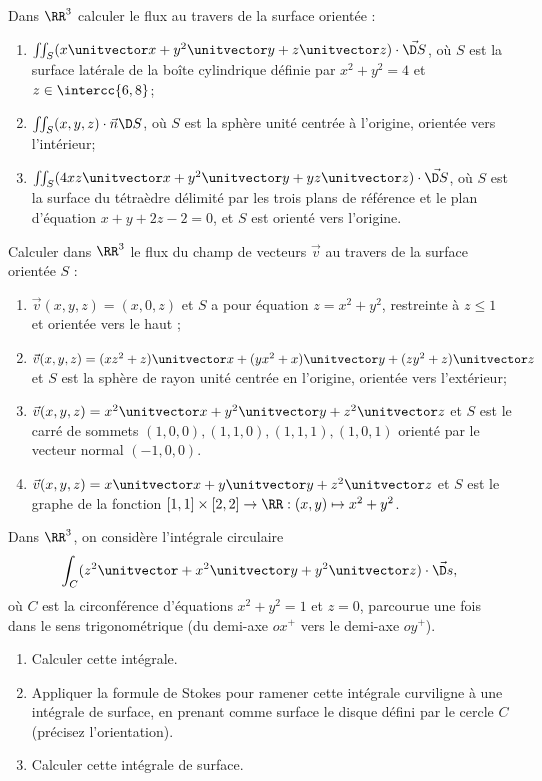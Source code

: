 \documentclass[12pt,french,oneside,a4paper]{memoir} %
\begin{document}
\begin{exo}
Dans $\RR^{3}$ calculer le flux au travers de la surface orientée :
\begin{enumerate}
\item $\iint_{S} (x \unitvector x + y^{2} \unitvector y + z \unitvector z)\cdot \vec{\D S}$, où $S$ est la surface latérale de la \og boîte cylindrique\fg{} définie par $x^{2} + y^{2} = 4$ et $z \in \intercc{6,8}$;
\item $\iint_{S} (x,y,z)\cdot \vec n \D S$, où $S$ est la sphère unité centrée à l'origine, orientée vers l'intérieur;
\item $\iint_{S} (4xz \unitvector x + y^{2} \unitvector y + yz \unitvector z)\cdot \vec{\D S}$, où $S$ est la surface du tétraèdre délimité par les trois plans de référence et le plan d'équation $x + y + 2z - 2 = 0$, et $S$ est orienté vers l'origine.
\end{enumerate}
\end{exo}
\begin{exo}
Calculer dans $\RR^{3}$ le flux du champ de vecteurs $\vec v$ au travers de la surface orientée $S$ :
\begin{enumerate}
\item $\vec v (x,y,z) = (x,0,z)$ et $S$ a pour équation $z = x^{2}+ y^{2}$, restreinte à $z \leq 1$ et orientée vers le haut ;
\item $\vec v (x,y,z) = (xz^{2} + z) \unitvector x + (y x^{2} + x)\unitvector y + (zy^{2} + z)\unitvector z$ et $S$ est la sphère de rayon unité centrée en l'origine, orientée vers l'extérieur;
\item $\vec v(x,y,z) = x^{2} \unitvector x + y^{2} \unitvector y + z^{2} \unitvector z$ et $S$ est le carré de sommets $(1,0,0), (1,1,0), (1,1,1), (1,0,1)$ orienté par le vecteur normal $(-1,0,0)$.
\item $\vec v(x,y,z) = x \unitvector x + y \unitvector y + z^{2} \unitvector z$ et $S$ est le graphe de la fonction $[1,1] \times [2,2] \to \RR : (x,y) \mapsto x^{2}+y^{2}$.
\end{enumerate}
\end{exo}

\begin{exo}
Dans $\RR^{3}$, on considère l'intégrale circulaire
\begin{equation*}
  \int_{C} (z^{2}\unitvector + x^{2} \unitvector y + y^{2}\unitvector z)\cdot \vec{\D s},
\end{equation*}
où $C$ est la circonférence d'équations $x^{2} + y^{2} = 1$ et $z = 0$, parcourue une fois dans le sens trigonométrique (du demi-axe $ox^{+}$ vers le demi-axe $oy^{+}$).
\begin{enumerate}
\item Calculer cette intégrale.
\item Appliquer la formule de Stokes pour ramener cette intégrale curviligne à une intégrale de surface, en prenant comme surface le disque défini par le cercle $C$ (précisez l'orientation).
\item Calculer cette intégrale de surface.
\end{enumerate}
\end{exo}
\end{document}

